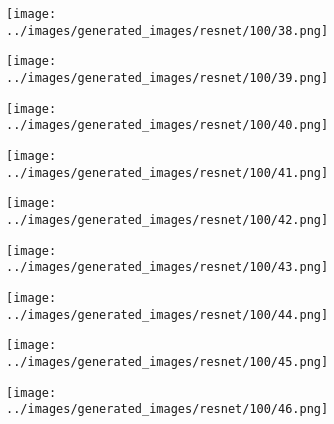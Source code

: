 \begin{figure}[H]
\begin{subfigure}[b]{0.1\textwidth}
\end{subfigure}
\hspace{1em}%
\begin{subfigure}[b]{0.1\textwidth}
\centering
\texttt{[image: ../images/generated\_images/resnet/100/38.png]}
\end{subfigure}
\hspace{1em}%
\begin{subfigure}[b]{0.1\textwidth}
\centering
\texttt{[image: ../images/generated\_images/resnet/100/39.png]}
\end{subfigure}
\hspace{1em}%
\begin{subfigure}[b]{0.1\textwidth}
\centering
\texttt{[image: ../images/generated\_images/resnet/100/40.png]}
\end{subfigure}
\hspace{1em}%
\begin{subfigure}[b]{0.1\textwidth}
\centering
\texttt{[image: ../images/generated\_images/resnet/100/41.png]}
\end{subfigure}
\hspace{1em}%
\begin{subfigure}[b]{0.1\textwidth}
\centering
\texttt{[image: ../images/generated\_images/resnet/100/42.png]}
\end{subfigure}
\hspace{1em}%
\begin{subfigure}[b]{0.1\textwidth}
\centering
\texttt{[image: ../images/generated\_images/resnet/100/43.png]}
\end{subfigure}
\hspace{1em}%
\begin{subfigure}[b]{0.1\textwidth}
\centering
\texttt{[image: ../images/generated\_images/resnet/100/44.png]}
\end{subfigure}
\hspace{1em}%
\begin{subfigure}[b]{0.1\textwidth}
\centering
\texttt{[image: ../images/generated\_images/resnet/100/45.png]}
\end{subfigure}
\hspace{1em}%
\begin{subfigure}[b]{0.1\textwidth}
\centering
\texttt{[image: ../images/generated\_images/resnet/100/46.png]}
\end{subfigure}
\hspace{1em}%

\end{figure}
